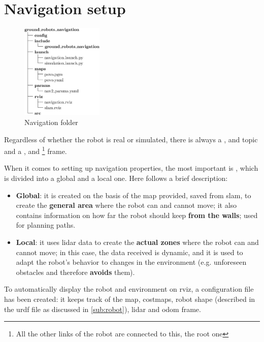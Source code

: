 \section{Navigation setup}

\begin{figure}
    \includegraphics[width=0.35\textwidth]{images/nav_folder}
    \caption{Navigation folder}
\end{figure}

Regardless of whether the robot is real or simulated, there is always a ,  and  topic and a ,  and \footnote{All the other links of the robot are connected to this, the root one} frame.

When it comes to setting up navigation properties, the most important is , which is divided into a global and a local one. Here follows a brief description:
\begin{itemize}
    \item \textbf{Global}: it is created on the basis of the map provided, saved from \acrshort{slam}, to create the \textbf{general area} where the robot can and cannot move; it also contains information on how far the robot should keep \textbf{from the walls}; used for planning paths.
    \item \textbf{Local}: it uses lidar data to create the \textbf{actual zones} where the robot can and cannot move; in this case, the data received is dynamic, and it is used to adapt the robot's behavior to changes in the environment (e.g. unforeseen obstacles and therefore \textbf{avoids} them).
\end{itemize}

To automatically display the robot and environment on \acrshort{rviz}, a configuration file has been created: it keeps track of the map, costmaps, robot shape (described in the \acrshort{urdf} file as discussed in \autoref{sub:robot}), lidar and odom frame. 

